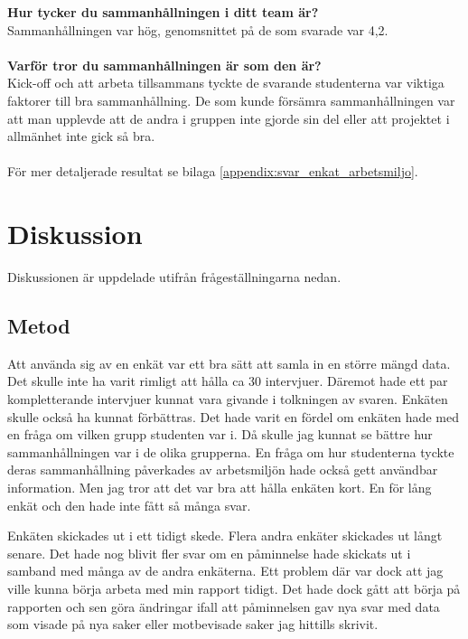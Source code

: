 \textbf{Hur tycker du sammanhållningen i ditt team är?}\\
Sammanhållningen var hög, genomsnittet på de som svarade var 4,2.\\\\
\textbf{Varför tror du sammanhållningen är som den är?}\\
Kick-off och att arbeta tillsammans tyckte de svarande studenterna var viktiga faktorer till bra sammanhållning. De som kunde försämra sammanhållningen var att man upplevde att de andra i gruppen inte gjorde sin del eller att projektet i allmänhet inte gick så bra.\\\\
För mer detaljerade resultat se bilaga \ref{appendix:svar_enkat_arbetsmiljo}.

\section{Diskussion}
\label{sec:discussion-hampus}
Diskussionen är uppdelade utifrån frågeställningarna nedan.

\subsection{Metod}
Att använda sig av en enkät var ett bra sätt att samla in en större mängd data. Det skulle inte ha varit rimligt att hålla ca 30 intervjuer. Däremot hade ett par kompletterande intervjuer kunnat vara givande i tolkningen av svaren. Enkäten skulle också ha kunnat förbättras. Det hade varit en fördel om enkäten hade med en fråga om vilken grupp studenten var i. Då skulle jag kunnat se bättre hur sammanhållningen var i de olika grupperna. En fråga om hur studenterna tyckte deras sammanhållning påverkades av arbetsmiljön hade också gett användbar information.	Men jag tror att det var bra att hålla enkäten kort. En för lång enkät och den hade inte fått så många svar. 

Enkäten skickades ut i ett tidigt skede. Flera andra enkäter skickades ut långt senare. Det hade nog blivit fler svar om en påminnelse hade skickats ut i samband med många av de andra enkäterna. Ett problem där var dock att jag ville kunna börja arbeta med min rapport tidigt. Det hade dock gått att börja på rapporten och sen göra ändringar ifall att påminnelsen gav nya svar med data som visade på nya saker eller motbevisade saker jag hittills skrivit. 

